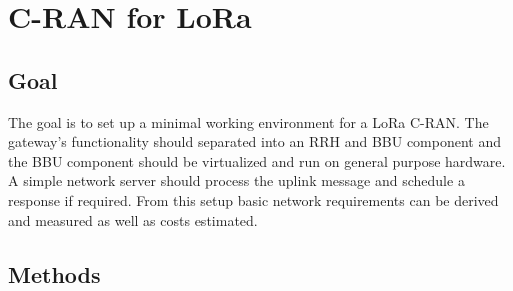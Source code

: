 \chapter{C-RAN for LoRa}
\label{chap:cran_for_lora}

\section{Goal}
The goal is to set up a minimal working environment for a LoRa C-RAN.
The gateway's functionality should separated into an RRH and BBU component and the 
BBU component should be virtualized and run on general purpose hardware. 
A simple network server should process the uplink message and schedule a response if required. From this setup 
basic network requirements can be derived and measured as well as costs estimated.

\section{Methods}


